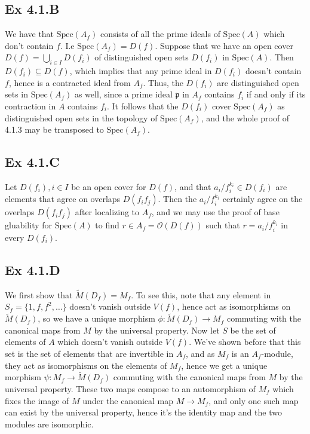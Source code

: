 \documentclass{article}
\theoremstyle{definition}
\newcommand{\Spec}{\text{Spec}}
\begin{document}
\subsection*{Ex 4.1.B}

We have that $\Spec(A_{f})$ consists of all the prime ideals of $\Spec(A)$
which don't contain $f$. I.e $\Spec(A_{f}) = D(f)$. Suppose that we have an
open cover $D(f) = \bigcup_{i \in I} D(f_i)$ of distinguished open sets
$D(f_i)$ in $\Spec(A)$. Then $D(f_i) \subseteq D(f)$, which implies that any
prime ideal in $D(f_i)$ doesn't contain $f$, hence is a contracted ideal from
$A_f$. Thus, the $D(f_i)$ are distinguished open sets in $\Spec(A_f)$ as well,
since a prime ideal $\mathfrak{p}$ in $A_f$ contains $f_i$ if and only if its
contraction in $A$ contains $f_i$. It follows that the $D(f_i)$ cover
$\Spec(A_f)$ as distinguished open sets in the topology of $\Spec(A_f)$, and
the whole proof of 4.1.3 may be transposed to $\Spec(A_f)$.

\subsection*{Ex 4.1.C}

Let $D(f_i), i \in I$ be an open cover for $D(f)$, and that $a_i/f_i^{k_i} \in
D(f_i)$ are elements that agree on overlaps $D(f_if_j)$. Then the
$a_i/f_i^{k_i}$ certainly agree on the overlaps $D(f_if_j)$ after localizing to
$A_f$, and we may use the proof of base gluability for $\Spec(A)$ to find $r
\in A_f = \mathcal{O}(D(f))$ such that $r = a_i/f_i^{k_i}$ in every $D(f_i)$.

\subsection*{Ex 4.1.D}


We first show that $\widetilde{M}(D_f) = M_{f}$. To see this, note that any
element in $S_{f} = \{1, f, f^2, \ldots \}$ doesn't vanish outside $V(f)$,
hence act as isomorphisms on $\widetilde{M}(D_f)$, so we have a unique morphism
$\phi : \widetilde{M}(D_f) \to M_f$ commuting with the canonical maps from $M$
by the universal property. Now let $S$ be the set of elements of $A$ which
doesn't vanish outside $V(f)$. We've shown before that this set is the set of
elements that are invertible in $A_f$, and as $M_f$ is an $A_f$-module, they
act as isomorphisms on the elements of $M_f$, hence we get a unique morphism
$\psi : M_f \to \widetilde{M}(D_f)$ commuting with the canonical maps from $M$
by the universal property. These two maps compose to an automorphism of $M_f$
which fixes the image of $M$ under the canonical map $M \to M_f$, and only one
such map can exist by the universal property, hence it's the identity map and
the two modules are isomorphic. \\
\end{document}
